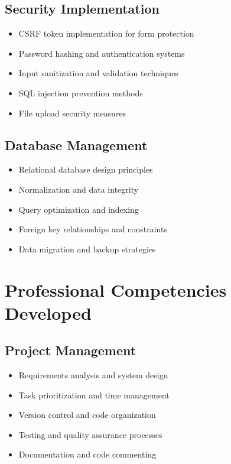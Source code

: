 \subsection{Security Implementation}
\begin{itemize}
    \item CSRF token implementation for form protection
    \item Password hashing and authentication systems
    \item Input sanitization and validation techniques
    \item SQL injection prevention methods
    \item File upload security measures
\end{itemize}

\subsection{Database Management}
\begin{itemize}
    \item Relational database design principles
    \item Normalization and data integrity
    \item Query optimization and indexing
    \item Foreign key relationships and constraints
    \item Data migration and backup strategies
\end{itemize}

\section{Professional Competencies Developed}

\subsection{Project Management}
\begin{itemize}
    \item Requirements analysis and system design
    \item Task prioritization and time management
    \item Version control and code organization
    \item Testing and quality assurance processes
    \item Documentation and code commenting
\end{itemize}

